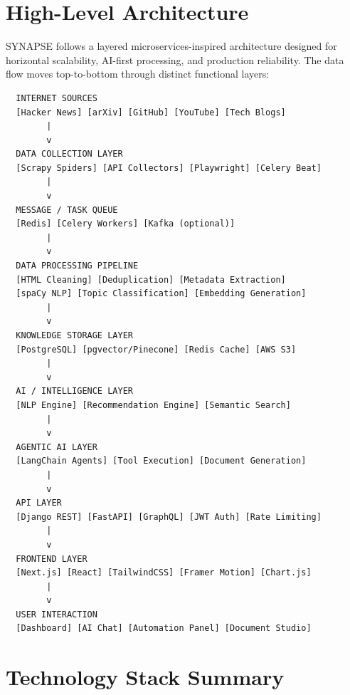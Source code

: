 \documentclass[12pt,a4paper]{report}
\begin{document}
\section{High-Level Architecture}

SYNAPSE follows a layered microservices-inspired architecture designed for horizontal
scalability, AI-first processing, and production reliability. The data flow moves
top-to-bottom through distinct functional layers:

\begin{verbatim}
  INTERNET SOURCES
  [Hacker News] [arXiv] [GitHub] [YouTube] [Tech Blogs]
        |
        v
  DATA COLLECTION LAYER
  [Scrapy Spiders] [API Collectors] [Playwright] [Celery Beat]
        |
        v
  MESSAGE / TASK QUEUE
  [Redis] [Celery Workers] [Kafka (optional)]
        |
        v
  DATA PROCESSING PIPELINE
  [HTML Cleaning] [Deduplication] [Metadata Extraction]
  [spaCy NLP] [Topic Classification] [Embedding Generation]
        |
        v
  KNOWLEDGE STORAGE LAYER
  [PostgreSQL] [pgvector/Pinecone] [Redis Cache] [AWS S3]
        |
        v
  AI / INTELLIGENCE LAYER
  [NLP Engine] [Recommendation Engine] [Semantic Search]
        |
        v
  AGENTIC AI LAYER
  [LangChain Agents] [Tool Execution] [Document Generation]
        |
        v
  API LAYER
  [Django REST] [FastAPI] [GraphQL] [JWT Auth] [Rate Limiting]
        |
        v
  FRONTEND LAYER
  [Next.js] [React] [TailwindCSS] [Framer Motion] [Chart.js]
        |
        v
  USER INTERACTION
  [Dashboard] [AI Chat] [Automation Panel] [Document Studio]
\end{verbatim}

\section{Technology Stack Summary}
\end{document}
